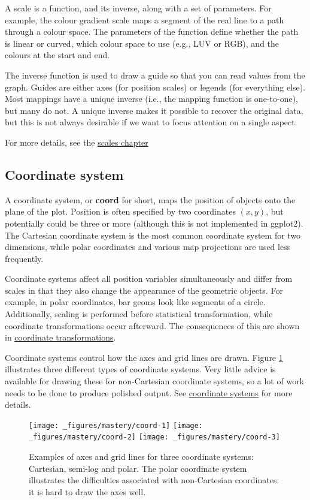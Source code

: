 A scale is a function, and its inverse, along with a set of parameters.
For example, the colour gradient scale maps a segment of the real line
to a path through a colour space. The parameters of the function define
whether the path is linear or curved, which colour space to use (e.g.,
LUV or RGB), and the colours at the start and end.

The inverse function is used to draw a guide so that you can read values
from the graph. Guides are either axes (for position scales) or legends
(for everything else). Most mappings have a unique inverse (i.e., the
mapping function is one-to-one), but many do not. A unique inverse makes
it possible to recover the original data, but this is not always
desirable if we want to focus attention on a single aspect.

For more details, see the \hyperref[cha:scales]{scales chapter}

\subsection{Coordinate system}\label{sub:coordinate-systems}

A coordinate system, or \textbf{coord} for short, maps the position of
objects onto the plane of the plot. Position is often specified by two
coordinates \((x, y)\), but potentially could be three or more (although
this is not implemented in ggplot2). The Cartesian coordinate system is
the most common coordinate system for two dimensions, while polar
coordinates and various map projections are used less frequently.

Coordinate systems affect all position variables simultaneously and
differ from scales in that they also change the appearance of the
geometric objects. For example, in polar coordinates, bar geoms look
like segments of a circle. Additionally, scaling is performed before
statistical transformation, while coordinate transformations occur
afterward. The consequences of this are shown in
\hyperref[sub:coord-non-linear]{coordinate transformations}.

Coordinate systems control how the axes and grid lines are drawn. Figure
\ref{fig:coord} illustrates three different types of coordinate systems.
Very little advice is available for drawing these for non-Cartesian
coordinate systems, so a lot of work needs to be done to produce
polished output. See \hyperref[sec:coord]{coordinate systems} for more
details.

\begin{figure}[H]
  \texttt{[image: \_figures/mastery/coord-1]}%
  \texttt{[image: \_figures/mastery/coord-2]}%
  \texttt{[image: \_figures/mastery/coord-3]}
  \caption{Examples of axes and grid lines for three coordinate systems: Cartesian, semi-log and polar. The polar coordinate system illustrates the difficulties associated with non-Cartesian coordinates: it is hard to draw the axes well.}
  \label{fig:coord}
\end{figure}

